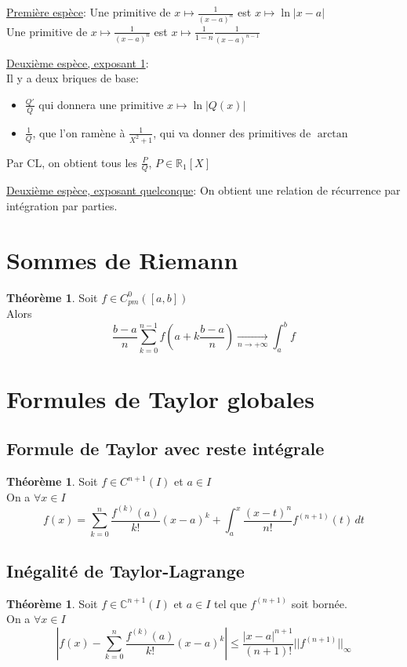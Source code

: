 \documentclass[10pt,a4paper]{article}
\theoremstyle{definition}
\newtheorem{theorem}[proposition]{Théorème}
\begin{document}
\noindent \uline{Première espèce}: Une primitive de $x \mapsto \frac{1}{(x - a)^n}$ est $x \mapsto \ln|x - a|$ \\
Une primitive de $x \mapsto \frac{1}{(x - a)^n}$ est $x \mapsto \frac{1}{1 - n} \frac{1}{(x - a)^{n - 1}}$ \medskip

\noindent \uline{Deuxième espèce, exposant 1}: \\
Il y a deux briques de base:
\begin{itemize}
\item $\frac{Q'}{Q}$ qui donnera une primitive $x \mapsto \ln|Q(x)|$
\item $\frac{1}{Q}$, que l'on ramène à $\frac{1}{X^2	+ 1}$, qui va donner des primitives de $\arctan$
\end{itemize}
Par CL, on obtient tous les $\frac{P}{Q}$, $P \in \mathbb{R}_1[X]$ \medskip

\noindent \uline{Deuxième espèce, exposant quelconque}: On obtient une relation de récurrence par intégration par parties.

\section{Sommes de Riemann}
\begin{theorem}
Soit $f \in C_{pm}^0([a, b])$ \\
Alors
\[ \frac{b - a}{n} \sum_{k = 0}^{n - 1} f\left( a + k \frac{b - a}{n}\right) \xrightarrow[n \to +\infty]{} \int_a^b f\]
\end{theorem}

\section{Formules de Taylor globales}
\subsection{Formule de Taylor avec reste intégrale}
\begin{theorem}
Soit $f \in C^{n + 1}(I)$ et $a \in I$ \\
On a $\forall x \in I$
\[f(x) = \sum_{k = 0}^n \frac{f^{(k)}(a)}{k!}(x - a)^k + \int_a^x \frac{(x - t)^n}{n!} f^{(n + 1)}(t) \, dt\]
\end{theorem}

\subsection{Inégalité de Taylor-Lagrange}
\begin{theorem}
Soit $f \in \mathbb{C}^{n + 1}(I)$ et $a \in I$ tel que $f^{(n + 1)}$ soit bornée. \\
On a $\forall x \in I$
\[\left| f(x) - \sum_{k = 0}^n \frac{f^{(k)}(a)}{k!}(x - a)^k \right| \leq \frac{|x - a|^{n + 1}}{(n + 1)!} ||f^{(n + 1)}||_\infty\]
\end{theorem}
\end{document}
